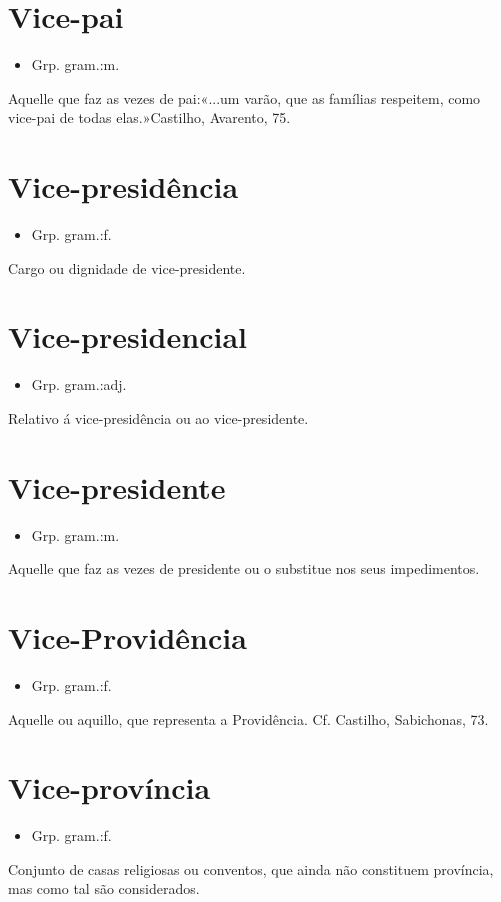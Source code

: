 \documentclass{article}
\begin{document}
\section{Vice-pai}
\begin{itemize}
\item {Grp. gram.:m.}
\end{itemize}
Aquelle que faz as vezes de pai:«\textunderscore ...um varão, que as famílias respeitem, como vice-pai de todas elas.\textunderscore »Castilho, \textunderscore Avarento\textunderscore , 75.
\section{Vice-presidência}
\begin{itemize}
\item {Grp. gram.:f.}
\end{itemize}
Cargo ou dignidade de vice-presidente.
\section{Vice-presidencial}
\begin{itemize}
\item {Grp. gram.:adj.}
\end{itemize}
Relativo á vice-presidência ou ao vice-presidente.
\section{Vice-presidente}
\begin{itemize}
\item {Grp. gram.:m.}
\end{itemize}
Aquelle que faz as vezes de presidente ou o substitue nos seus impedimentos.
\section{Vice-Providência}
\begin{itemize}
\item {Grp. gram.:f.}
\end{itemize}
Aquelle ou aquillo, que representa a Providência. Cf. Castilho, \textunderscore Sabichonas\textunderscore , 73.
\section{Vice-província}
\begin{itemize}
\item {Grp. gram.:f.}
\end{itemize}
Conjunto de casas religiosas ou conventos, que ainda não constituem província, mas como tal são considerados.
\end{document}
